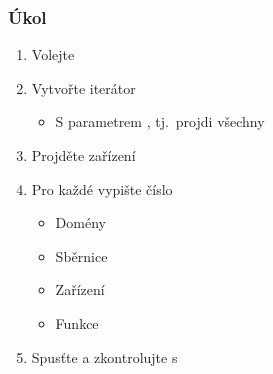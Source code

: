 \begin{frame}
  \frametitle{Úkol}

  \begin{enumerate}
    \item Volejte 
    \item Vytvořte iterátor
    \begin{itemize}
      \item S parametrem , tj.\ projdi všechny
    \end{itemize}

    \item Projděte zařízení

    \item Pro každé vypište číslo
    \begin{itemize}
      \item Domény
      \item Sběrnice
      \item Zařízení
      \item Funkce
    \end{itemize}

    \item Spusťte a zkontrolujte s 
  \end{enumerate}

\end{frame}

